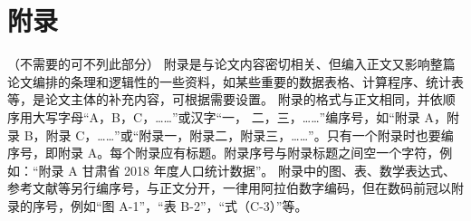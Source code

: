 \chapter*{附\quad 录}
\textcolor[rgb]{1.00,0.00,0.00}{（不需要的可不列此部分）}
附录是与论文内容密切相关、但编入正文又影响整篇论文编排的条理和逻辑性的一些资料，如某些重要的数据表格、计算程序、统计表等，是论文主体的补充内容，可根据需要设置。
附录的格式与正文相同，并依顺序用大写字母“A，B，C，……”或汉字“一，
二，三，……”编序号，如“附录 A，附录 B，附录 C，……”或“附录一，附录二，附录三，……”。只有一个附录时也要编序号，即附录
A。每个附录应有标题。附录序号与附录标题之间空一个字符，例如：“附录 A
甘肃省 2018 年度人口统计数据”。
附录中的图、表、数学表达式、参考文献等另行编序号，与正文分开，一律用阿拉伯数字编码，但在数码前冠以附录的序号，例如“图 A-1”，“表
B-2”，“式（C-3）”等。

